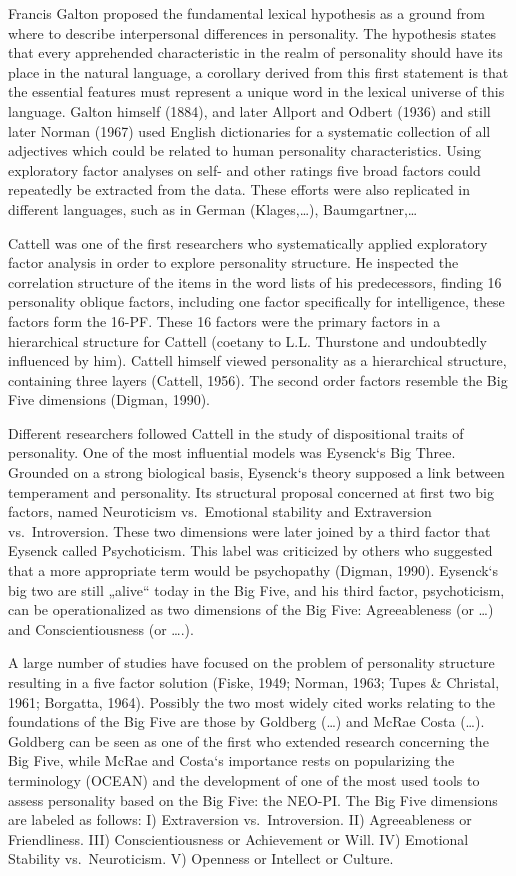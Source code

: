 \documentclass[,man,floatsintext]{apa6}
\theoremstyle{definition}
\theoremstyle{definition}
\theoremstyle{definition}
\theoremstyle{remark}
\begin{document}
Francis Galton proposed the fundamental lexical hypothesis as a ground
from where to describe interpersonal differences in personality. The
hypothesis states that every apprehended characteristic in the realm of
personality should have its place in the natural language, a corollary
derived from this first statement is that the essential features must
represent a unique word in the lexical universe of this language. Galton
himself (1884), and later Allport and Odbert (1936) and still later
Norman (1967) used English dictionaries for a systematic collection of
all adjectives which could be related to human personality
characteristics. Using exploratory factor analyses on self- and other
ratings five broad factors could repeatedly be extracted from the data.
These efforts were also replicated in different languages, such as in
German (Klages,\ldots{}), Baumgartner,\ldots{}

Cattell was one of the first researchers who systematically applied
exploratory factor analysis in order to explore personality structure.
He inspected the correlation structure of the items in the word lists of
his predecessors, finding 16 personality oblique factors, including one
factor specifically for intelligence, these factors form the 16-PF.
These 16 factors were the primary factors in a hierarchical structure
for Cattell (coetany to L.L. Thurstone and undoubtedly influenced by
him). Cattell himself viewed personality as a hierarchical structure,
containing three layers (Cattell, 1956). The second order factors
resemble the Big Five dimensions (Digman, 1990).

Different researchers followed Cattell in the study of dispositional
traits of personality. One of the most influential models was Eysenck`s
Big Three. Grounded on a strong biological basis, Eysenck`s theory
supposed a link between temperament and personality. Its structural
proposal concerned at first two big factors, named Neuroticism
vs.~Emotional stability and Extraversion vs.~Introversion. These two
dimensions were later joined by a third factor that Eysenck called
Psychoticism. This label was criticized by others who suggested that a
more appropriate term would be psychopathy (Digman, 1990). Eysenck`s big
two are still „alive`` today in the Big Five, and his third factor,
psychoticism, can be operationalized as two dimensions of the Big Five:
Agreeableness (or \ldots{}) and Conscientiousness (or \ldots{}.).

A large number of studies have focused on the problem of personality
structure resulting in a five factor solution (Fiske, 1949; Norman,
1963; Tupes \& Christal, 1961; Borgatta, 1964). Possibly the two most
widely cited works relating to the foundations of the Big Five are those
by Goldberg (\ldots{}) and McRae Costa (\ldots{}). Goldberg can be seen
as one of the first who extended research concerning the Big Five, while
McRae and Costa`s importance rests on popularizing the terminology
(OCEAN) and the development of one of the most used tools to assess
personality based on the Big Five: the NEO-PI. The Big Five dimensions
are labeled as follows: I) Extraversion vs.~Introversion. II)
Agreeableness or Friendliness. III) Conscientiousness or Achievement or
Will. IV) Emotional Stability vs.~Neuroticism. V) Openness or Intellect
or Culture.
\end{document}
